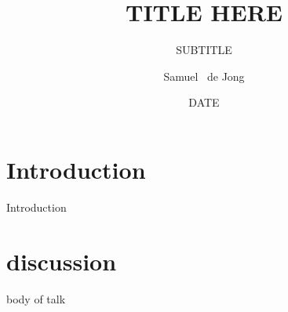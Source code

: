 \documentclass[xcolor=dvipsnames]{beamer}
\title
{TITLE HERE}
\subtitle
{SUBTITLE}
\author[Samuel de Jong] 
{Samuel ~de Jong}
\date 
{DATE}
\begin{document}
\begin{frame}
  \titlepage

\end{frame}

\newcommand*\oldmacro{}%
\let\oldmacro\insertshorttitle%
\renewcommand*\insertshorttitle{%
\vspace{-0.05cm}
\texttt{[image: /home/sam/Pictures/belle2-logo.pdf]}
\hspace{0.15cm}
\oldmacro%
\hspace{0.15cm}
\texttt{[image: /home/sam/Pictures/UVic\_Shield]}
}




\section{Introduction}






\begin{frame}{Introduction}

\end{frame}


%

\section{discussion}

\begin{frame}{body of talk}


\begin{columns}
\column{2in}
\centering
\begin{figure}	
\end{figure}

\begin{figure}	
\end{figure}

	
\column{2in}
\centering
\begin{figure}	
\end{figure}

\begin{figure}	
\end{figure}

\end{columns}


\end{frame}
\end{document}
